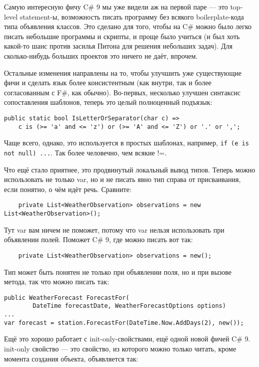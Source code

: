\documentclass{../../text-style}
\begin{document}
Самую интересную фичу C\# 9 мы уже видели аж на первой паре --- это top-level statement-ы, возможность писать программу без всякого boilerplate-кода типа объявления классов. Это сделано для того, чтобы на C\# можно было легко писать небольшие программы и скрипты, и проще было учиться (и был хоть какой-то шанс против засилья Питона для решения небольших задач). Для сколько-нибудь больших проектов это ничего не даёт, впрочем.

Остальные изменения направлены на то, чтобы улучшить уже существующие фичи и сделать язык более консистентным (как внутри, так и более согласованным с F\#, как обычно). Во-первых, несколько улучшен синтаксис сопоставления шаблонов, теперь это целый полноценный подъязык:

\begin{verbatim}
public static bool IsLetterOrSeparator(char c) =>
    c is (>= 'a' and <= 'z') or (>= 'A' and <= 'Z') or '.' or ',';
\end{verbatim}

Чаще всего, однако, это используется в простых шаблонах, например, \texttt{if (e is not null) ...}. Так более человечно, чем всякие !=.

Что ещё стало приятнее, это продвинутый локальный вывод типов. Теперь можно использовать не только var, но и не писать явно тип справа от присваивания, если понятно, о чём идёт речь. Сравните:

\begin{verbatim}
    private List<WeatherObservation> observations = new List<WeatherObservation>();
\end{verbatim}

Тут var вам ничем не поможет, потому что var нельзя использовать при объявлении полей. Поможет C\# 9, где можно писать вот так:

\begin{verbatim}
    private List<WeatherObservation> observations = new();
\end{verbatim}

Тип может быть понятен не только при объявлении поля, но и при вызове метода, так что можно писать так:

\begin{verbatim}
public WeatherForecast ForecastFor(
        DateTime forecastDate, WeatherForecastOptions options)
...
var forecast = station.ForecastFor(DateTime.Now.AddDays(2), new());
\end{verbatim}


Ещё это хорошо работает с init-only-свойствами, ещё одной новой фичей C\# 9. init-only свойство --- это свойство, из которого можно только читать, кроме момента создания объекта, объявляется так:
\end{document}
